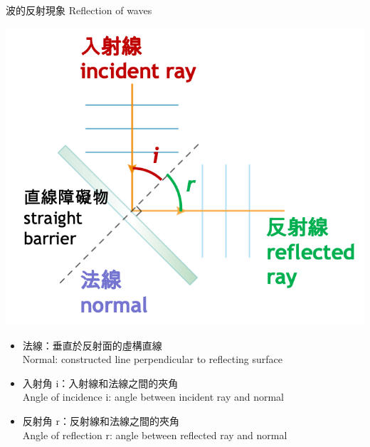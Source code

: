 \documentclass[beamer=true]{standalone}
\begin{document}
\begin{frame}{波的反射現象 Reflection of waves}


    \par{\par\centering\includegraphics[width=.4\textwidth]{./img/ch2_cf_2024-05-24-14-03-41.png}\par}
    \begin{itemize}
        \item 法線：垂直於反射面的虛構直線\\Normal: constructed line perpendicular to reflecting surface

        \item 入射角 i：入射線和法線之間的夾角\\Angle of incidence i: angle between incident ray and normal
        \item 反射角 r：反射線和法線之間的夾角\\Angle of reflection r: angle between reflected ray and normal
    \end{itemize}
\end{frame}
\end{document}
